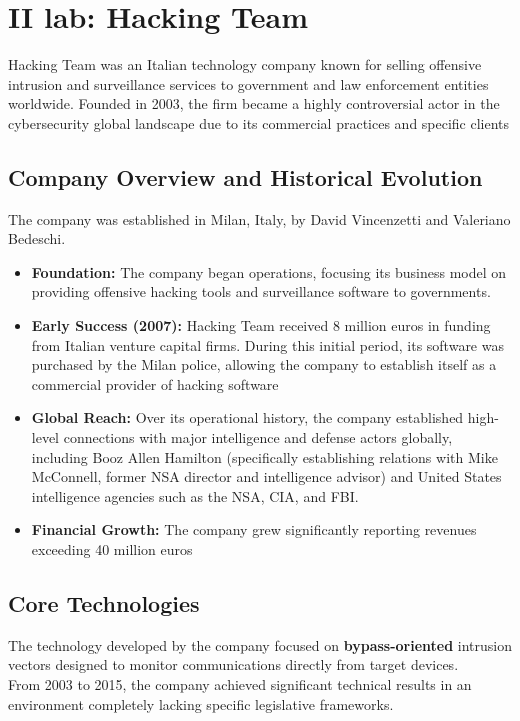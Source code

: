 \section{II lab: Hacking Team}

Hacking Team was an Italian technology company known for selling offensive intrusion and surveillance services to government and law enforcement entities worldwide. Founded in 2003, the firm became a highly controversial actor in the cybersecurity global landscape due to its commercial practices and specific clients



\subsection{Company Overview and Historical Evolution}
The company was established in Milan, Italy, by David Vincenzetti and Valeriano Bedeschi. 
\begin{itemize}
    \item \textbf{Foundation:} The company began operations, focusing its business model on providing offensive hacking tools and surveillance software to governments.
    \item \textbf{Early Success (2007):} Hacking Team received 8 million euros in funding from Italian venture capital firms. During this initial period, its software was purchased by the Milan police, allowing the company to establish itself as a commercial provider of hacking software
    \item \textbf{Global Reach:} Over its operational history, the company established high-level connections with major intelligence and defense actors globally, including Booz Allen Hamilton (specifically establishing relations with Mike McConnell, former NSA director and intelligence advisor) and United States intelligence agencies such as the NSA, CIA, and FBI.
    \item \textbf{Financial Growth:} The company grew significantly reporting revenues exceeding 40 million euros
\end{itemize}



\subsection{Core Technologies}
The technology developed by the company focused on \textbf{bypass-oriented} intrusion vectors designed to monitor communications directly from target devices. \\
From 2003 to 2015, the company achieved significant technical results in an environment completely lacking specific legislative frameworks.
\medskip

